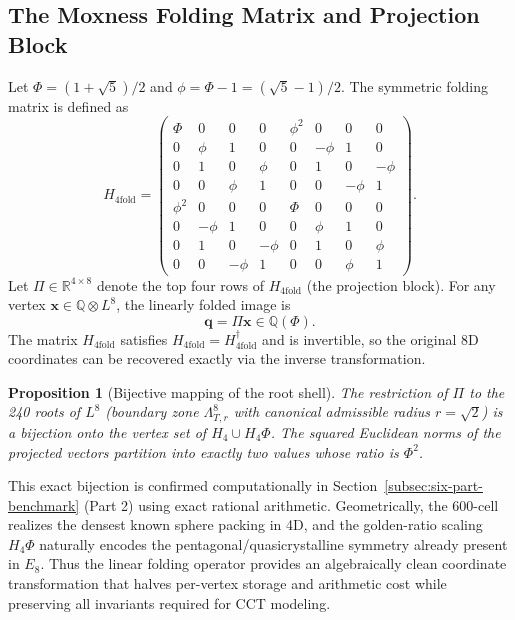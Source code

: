 \documentclass{article}
\newtheorem{proposition}{Proposition}
\begin{document}
\subsection{The Moxness Folding Matrix and Projection Block}
\label{sec:h4-folding:the-matrix}

Let \(\Phi = (1 + \sqrt{5})/2\) and \(\phi = \Phi - 1 = (\sqrt{5} - 1)/2\). The symmetric folding matrix is defined as
\begin{equation}
H_{4\mathrm{fold}} =
\begin{pmatrix}
\Phi & 0 & 0 & 0 & \phi^2 & 0 & 0 & 0 \\
0 & \phi & 1 & 0 & 0 & -\phi & 1 & 0 \\
0 & 1 & 0 & \phi & 0 & 1 & 0 & -\phi \\
0 & 0 & \phi & 1 & 0 & 0 & -\phi & 1 \\
\phi^2 & 0 & 0 & 0 & \Phi & 0 & 0 & 0 \\
0 & -\phi & 1 & 0 & 0 & \phi & 1 & 0 \\
0 & 1 & 0 & -\phi & 0 & 1 & 0 & \phi \\
0 & 0 & -\phi & 1 & 0 & 0 & \phi & 1
\end{pmatrix}.
\label{eq:H4fold}
\end{equation}
Let \(\Pi \in \mathbb{R}^{4 \times 8}\) denote the top four rows of \(H_{4\mathrm{fold}}\) (the projection block). For any vertex \(\mathbf{x} \in \mathbb{Q} \otimes L^8\), the linearly folded image is
\begin{equation}
\mathbf{q} = \Pi \mathbf{x} \in \mathbb{Q}(\Phi).
\label{eq:linear-fold}
\end{equation}
The matrix \(H_{4\mathrm{fold}}\) satisfies \(H_{4\mathrm{fold}} = H_{4\mathrm{fold}}^{\dagger}\) and is invertible, so the original 8D coordinates can be recovered exactly via the inverse transformation.

\begin{proposition}[Bijective mapping of the root shell]
\label{prop:bijective-mapping-root-shell}
The restriction of \(\Pi\) to the 240 roots of \(L^8\) (boundary zone \(\Lambda_{T,r}^8\) with canonical admissible radius \(r = \sqrt{2}\)) is a bijection onto the vertex set of \(H_4 \cup H_4\Phi\). The squared Euclidean norms of the projected vectors partition into exactly two values whose ratio is \(\Phi^2\).
\end{proposition}

This exact bijection is confirmed computationally in Section~\ref{subsec:six-part-benchmark} (Part 2) using exact rational arithmetic. Geometrically, the 600-cell realizes the densest known sphere packing in 4D, and the golden-ratio scaling \(H_4\Phi\) naturally encodes the pentagonal/quasicrystalline symmetry already present in \(E_8\). Thus the linear folding operator provides an algebraically clean coordinate transformation that halves per-vertex storage and arithmetic cost while preserving all invariants required for CCT modeling.
\end{document}
